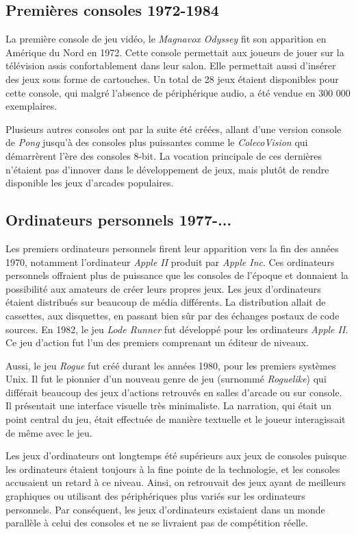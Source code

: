 \documentclass[12pt,twoside,letterpaper,francais]{book}
\newcommand{\lr}{{\textit{Lode Runner }}}
\begin{document}
\FloatBarrier
\subsection{Premières consoles 1972-1984}
La première console de jeu vidéo, le \textit{Magnavox Odyssey} fit son
apparition en Amérique du Nord en 1972. Cette console permettait aux
joueurs de jouer sur la télévision assis confortablement dans leur
salon. Elle permettait aussi d'insérer des jeux sous forme de
cartouches. Un total de 28 jeux étaient disponibles pour cette
console, qui malgré l'absence de périphérique audio, a été vendue en
300 000 exemplaires.

Plusieurs autres consoles ont par la suite été créées, allant d'une
version console de \textit{Pong} jusqu'à des consoles plus puissantes
comme le \textit{ColecoVision} qui démarrèrent l'ère des consoles
8-bit. La vocation principale de ces dernières n'étaient pas d'innover
dans le développement de jeux, mais plutôt de rendre disponible les
jeux d'arcades populaires.


\FloatBarrier
\subsection{Ordinateurs personnels 1977-...}
Les premiers ordinateurs personnels firent leur apparition vers la fin
des années 1970, notamment l'ordinateur \textit{Apple II} produit par
\textit{Apple Inc}. Ces ordinateurs personnels offraient plus de
puissance que les consoles de l'époque et donnaient la possibilité aux
amateurs de créer leurs propres jeux. Les jeux d'ordinateurs étaient
distribués sur beaucoup de média différents. La distribution allait de
cassettes, aux disquettes, en passant bien sûr par des échanges
postaux de code sources. En 1982, le jeu \lr fut développé pour les
ordinateurs \textit{Apple II}. Ce jeu d'action fut l'un des premiers
comprenant un éditeur de niveaux.

Aussi, le jeu \textit{Rogue} fut créé durant les années 1980, pour les
premiers systèmes Unix. Il fut le pionnier d'un nouveau genre de jeu
(surnommé \textit{Roguelike}) qui différait beaucoup des jeux
d'actions retrouvés en salles d'arcade ou sur console. Il présentait
une interface visuelle très minimaliste. La narration, qui était un
point central du jeu, était effectuée de manière textuelle et le
joueur interagissait de même avec le jeu.

Les jeux d'ordinateurs ont longtemps été supérieurs aux jeux de
consoles puisque les ordinateurs étaient toujours à la fine pointe de
la technologie, et les consoles accusaient un retard à ce
niveau. Ainsi, on retrouvait des jeux ayant de meilleurs graphiques ou
utilisant des périphériques plus variés sur les ordinateurs
personnels. Par conséquent, les jeux d'ordinateurs existaient dans un
monde parallèle à celui des consoles et ne se livraient pas de
compétition réelle.
\end{document}
